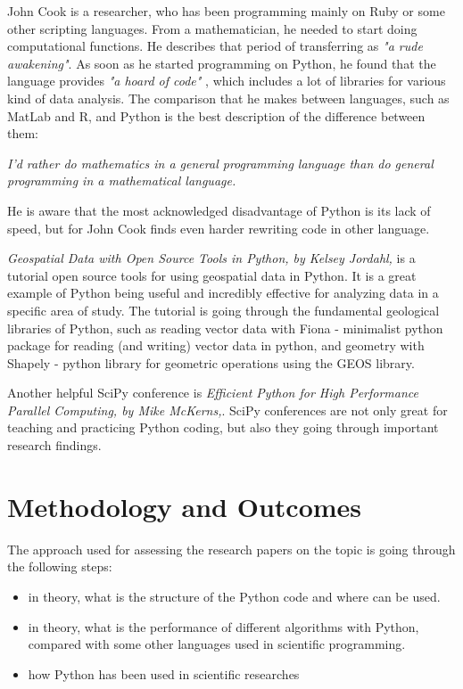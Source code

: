 \documentclass{article}
\begin{document}
John Cook is a researcher, who has been programming mainly on Ruby or some other scripting languages. From a mathematician, he needed to start doing computational functions. He describes that period of transferring as \textit{"a rude awakening"}.\cite{johnSciPy} As soon as he started programming on Python, he found that the language provides \textit{"a hoard of code"} \cite{johnSciPy}, which includes a lot of libraries for various kind of data analysis. The comparison that he makes between languages, such as MatLab and R, and Python is the best description of the difference between them:

\textit{I’d rather do mathematics in a general programming language than do general programming in a mathematical language.}

He is aware that the most acknowledged disadvantage of Python is its lack of speed, but for John Cook finds even harder rewriting code in other language. 

\textit{Geospatial Data with Open Source Tools in Python, by Kelsey Jordahl,} is a tutorial open source tools for using geospatial data in Python. \cite{efficientPython} It is a great example of Python being useful and incredibly effective for analyzing data in a specific area of study. The tutorial is going through the fundamental geological libraries of Python, such as reading vector data with Fiona - minimalist python package for reading (and writing) vector data in python, and geometry with Shapely - python library for geometric operations using the GEOS library. 

Another helpful SciPy conference is \textit{Efficient Python for High Performance Parallel Computing, by Mike McKerns,}. \cite{efficientPython} SciPy conferences are not only great for teaching and practicing Python coding, but also they going through important research findings. \cite{sciPy} 

\section{Methodology and Outcomes}
The approach used for assessing the research papers on the topic is going through the following steps:
\begin{itemize}
  \item in theory, what is the structure of the Python code and where can be used. 
  \item in theory, what is the performance of different algorithms with Python, compared with some other languages used in scientific programming.
  \item how Python has been used in scientific researches 
 \end{itemize}
 
\end{document}
